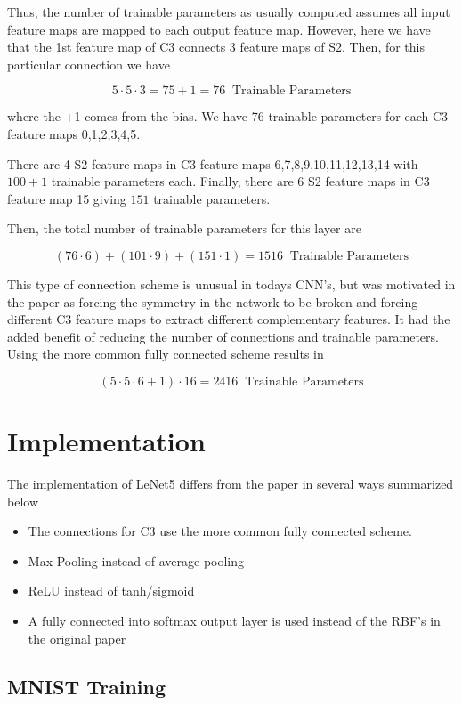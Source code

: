 \documentclass[11pt]{article}
\theoremstyle{definition}
\begin{document}
Thus, the number of trainable parameters as usually computed assumes all input feature maps are mapped to each output feature map. However, here we have that the 1st feature map of C3 connects 3 feature maps of S2. Then, for this particular connection we have

\[ 5 \cdot 5 \cdot 3 = 75 + 1 = 76 \; \; \text{Trainable Parameters} \]

where the +1 comes from the bias. We have 76 trainable parameters for each C3 feature maps 0,1,2,3,4,5.

There are 4 S2 feature maps in C3 feature maps 6,7,8,9,10,11,12,13,14 with $100 + 1$ trainable parameters each. Finally, there are 6 S2 feature maps in C3 feature map 15 giving $151$ trainable parameters.

Then, the total number of trainable parameters for this layer are 

\[ (76 \cdot 6) + (101 \cdot 9) + (151 \cdot 1) = 1516 \; \; \text{Trainable Parameters}\]

\bigskip

This type of connection scheme is unusual in todays CNN's, but was motivated in the paper as forcing the symmetry in the network to be broken and forcing different C3 feature maps to extract different complementary features. It had the added benefit of reducing the number of connections and trainable parameters. Using the more common fully connected scheme results in 

\[ (5 \cdot 5 \cdot 6 + 1) \cdot 16 = 2416 \; \; \text{Trainable Parameters}\]

\newpage
\section{Implementation}

The implementation of LeNet5 differs from the paper in several ways summarized below
\begin{itemize}
\item The connections for C3 use the more common fully connected scheme.
\item Max Pooling instead of average pooling
\item ReLU instead of tanh/sigmoid
\item A fully connected into softmax output layer is used instead of the RBF's in the original paper
\end{itemize}

\subsection{MNIST Training}
\end{document}

